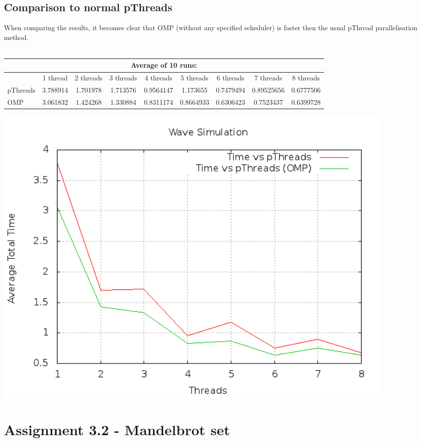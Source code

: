 \documentclass[a4paper]{article}
\begin{document}
    
  \subsection{Comparison to normal pThreads}
    When comparing the results, it becomes clear that OMP (without any specified scheduler) is faster then the usual pThread parallelisation method.\\\\
    \begin{tabular}{| l | c | c | c | c | c | c | c | c |}
      \hline
      \multicolumn{9}{|c|}{Average of 10 runs:}\\
      \hline
      & 1 thread & 2 threads & 3 threads & 4 threads & 5 threads & 6 threads & 7 threads & 8 threads\\
      \hline
      pThreads & 3.788914 & 1.701978 & 1.713576 & 0.9564147 & 1.173655 & 0.7479494 & 0.89525656 & 0.6777506\\
      \hline
      OMP & 3.061832 & 1.424268 & 1.330884 & 0.8311174 & 0.8664933 & 0.6306423 & 0.7523437 & 0.6399728\\
      \hline
    \end{tabular}
    \begin{center}
      \includegraphics[width=0.9\textwidth]{speedplot.png}
    \end{center}
\newpage
\section{Assignment 3.2 - Mandelbrot set}
\end{document}
